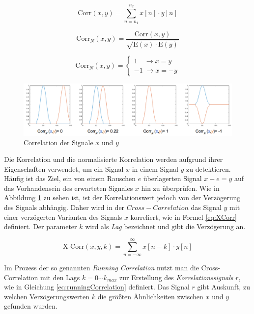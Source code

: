 \begin{equation}
\text{Corr}(x,y) = \sum_{n=n_1}^{n_2} x[n] \cdot y[n]
\label{eq:correlation}
\end{equation}

\begin{equation}
\text{Corr}_N(x,y) = \frac{\text{Corr}(x,y)}{\sqrt{\text{E}(x) \cdot \text{E}(y)}}
\label{eq:normCorrelation}
\end{equation}

\begin{equation}
\text{Corr}_N(x,y) = 
\begin{cases}
1  \quad \rightarrow  x = y \\
-1 \; \rightarrow x = -y
\end{cases}
\label{eq:correlationProps}
\end{equation}

\begin{figure}[h]
	\centering
	\includegraphics[width=1\textwidth]{bilder/corrSigsComp.png}
	\caption{Correlation der Signale $x$ und $y$}
	\label{img:corrSigsComp}
\end{figure}

Die Korrelation und die normalisierte Korrelation werden aufgrund ihrer Eigenschaften verwendet, um ein Signal $x$ in einem Signal $y$ zu detektieren. Häufig ist das Ziel, ein von einem Rauschen $e$ überlagerten Signal $x+e = y$ auf das Vorhandensein des erwarteten Signales $x$ hin zu überprüfen. Wie in Abbildung \ref{img:corrSigsComp} zu sehen ist, ist der Korrelationswert jedoch von der Verzögerung des Signals abhängig. Daher wird in der $Cross-Correlation$ das Signal $y$ mit einer verzögerten Varianten des Signals $x$ korreliert, wie in Formel \ref{eq:XCorr} definiert. Der parameter $k$ wird als \emph{Lag} bezeichnet und gibt die Verzögerung an. 

\begin{equation}
\text{X-Corr}(x,y,k) = \sum_{n=-\infty}^{\infty} x[n-k] \cdot y[n]
\label{eq:XCorr}
\end{equation}

Im Prozess der so genannten \emph{Running Correlation} nutzt man die Cross-Correlation mit den Lags $k = 0 \cdots k_{max}$ zur Erstellung des \emph{Korrelationssignals} $r$, wie in Gleichung \ref{eq:runningCorrelation} definiert. Das Signal $r$ gibt Auskunft, zu welchen Verzögerungswerten $k$ die größten Ähnlichkeiten zwischen $x$ und $y$ gefunden wurden. 


